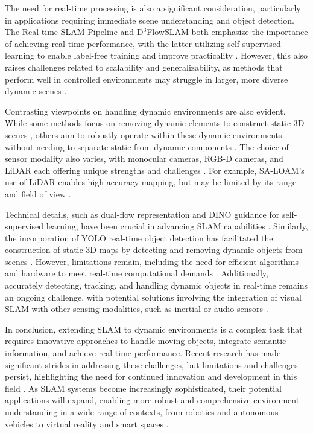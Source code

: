 \documentclass[conference]{IEEEtran}
\begin{document}
The need for real-time processing is also a significant consideration, particularly in applications requiring immediate scene understanding and object detection. The Real-time SLAM Pipeline and D$^3$FlowSLAM both emphasize the importance of achieving real-time performance, with the latter utilizing self-supervised learning to enable label-free training and improve practicality \cite{b2}. However, this also raises challenges related to scalability and generalizability, as methods that perform well in controlled environments may struggle in larger, more diverse dynamic scenes \cite{b6}.

Contrasting viewpoints on handling dynamic environments are also evident. While some methods focus on removing dynamic elements to construct static 3D scenes \cite{b4}, others aim to robustly operate within these dynamic environments without needing to separate static from dynamic components \cite{b2}. The choice of sensor modality also varies, with monocular cameras, RGB-D cameras, and LiDAR each offering unique strengths and challenges \cite{b3}. For example, SA-LOAM's use of LiDAR enables high-accuracy mapping, but may be limited by its range and field of view \cite{b5}.

Technical details, such as dual-flow representation and DINO guidance for self-supervised learning, have been crucial in advancing SLAM capabilities \cite{b2}. Similarly, the incorporation of YOLO real-time object detection has facilitated the construction of static 3D maps by detecting and removing dynamic objects from scenes \cite{b4}. However, limitations remain, including the need for efficient algorithms and hardware to meet real-time computational demands \cite{b6}. Additionally, accurately detecting, tracking, and handling dynamic objects in real-time remains an ongoing challenge, with potential solutions involving the integration of visual SLAM with other sensing modalities, such as inertial or audio sensors \cite{b7}.

In conclusion, extending SLAM to dynamic environments is a complex task that requires innovative approaches to handle moving objects, integrate semantic information, and achieve real-time performance. Recent research has made significant strides in addressing these challenges, but limitations and challenges persist, highlighting the need for continued innovation and development in this field \cite{b8}. As SLAM systems become increasingly sophisticated, their potential applications will expand, enabling more robust and comprehensive environment understanding in a wide range of contexts, from robotics and autonomous vehicles to virtual reality and smart spaces \cite{b9}.
\end{document}
